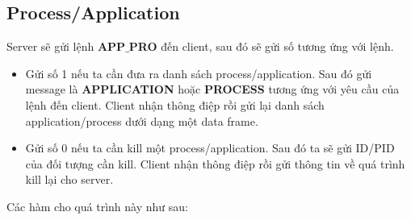 \subsection{Process/Application}
Server sẽ gửi lệnh \textbf{APP$\_$PRO} đến client, sau đó sẽ gửi số tương ứng với lệnh.
\begin{itemize}
\item Gửi số 1 nếu ta cần đưa ra danh sách process/application. Sau đó gửi message là \textbf{APPLICATION} hoặc \textbf{PROCESS} tương ứng với yêu cầu của lệnh đến client. Client nhận thông điệp rồi gửi lại danh sách application/process dưới dạng một data frame.
\item Gửi số 0 nếu ta cần kill một process/application. Sau đó ta sẽ gửi ID/PID của đối tượng cần kill. Client nhận thông điệp rồi gửi thông tin về quá trình kill lại cho server.
\end{itemize}
Các hàm cho quá trình này như sau:\\
